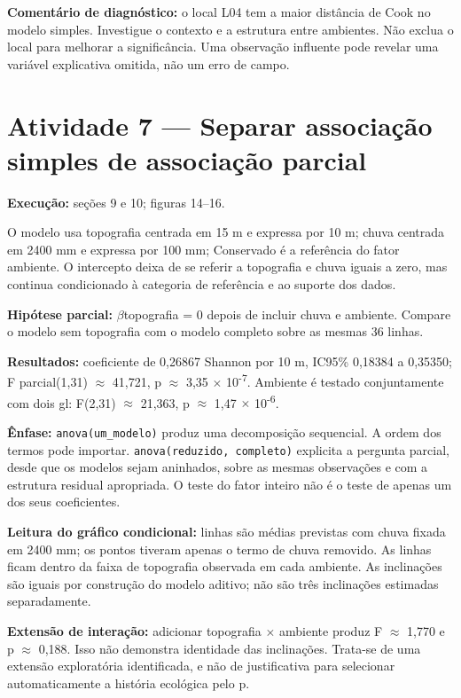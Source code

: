 \textbf{Comentário de diagnóstico:} o local L04 tem a maior distância de Cook no modelo simples. Investigue o contexto e a estrutura entre ambientes. Não exclua o local para melhorar a significância. Uma observação influente pode revelar uma variável explicativa omitida, não um erro de campo.

\section{Atividade 7 --- Separar associação simples de associação parcial}

\textbf{Execução:} seções 9 e 10; figuras 14--16.

O modelo usa topografia centrada em 15 m e expressa por 10 m; chuva centrada em 2400 mm e expressa por 100 mm; Conservado é a referência do fator ambiente. O intercepto deixa de se referir a topografia e chuva iguais a zero, mas continua condicionado à categoria de referência e ao suporte dos dados.

\textbf{Hipótese parcial:} \ensuremath{\beta}topografia = 0 depois de incluir chuva e ambiente. Compare o modelo sem topografia com o modelo completo sobre as mesmas 36 linhas.

\textbf{Resultados:} coeficiente de 0,26867 Shannon por 10 m, IC95\% 0,18384 a 0,35350; F parcial(1,31) \ensuremath{\approx} 41,721, p \ensuremath{\approx} 3,35 \ensuremath{\times} 10\textsuperscript{-}\textsuperscript{7}. Ambiente é testado conjuntamente com dois gl: F(2,31) \ensuremath{\approx} 21,363, p \ensuremath{\approx} 1,47 \ensuremath{\times} 10\textsuperscript{-}\textsuperscript{6}.

\textbf{Ênfase:} \texttt{anova(um\_modelo)} produz uma decomposição sequencial. A ordem dos termos pode importar. \texttt{anova(reduzido, completo)} explicita a pergunta parcial, desde que os modelos sejam aninhados, sobre as mesmas observações e com a estrutura residual apropriada. O teste do fator inteiro não é o teste de apenas um dos seus coeficientes.

\textbf{Leitura do gráfico condicional:} linhas são médias previstas com chuva fixada em 2400 mm; os pontos tiveram apenas o termo de chuva removido. As linhas ficam dentro da faixa de topografia observada em cada ambiente. As inclinações são iguais por construção do modelo aditivo; não são três inclinações estimadas separadamente.

\textbf{Extensão de interação:} adicionar topografia \ensuremath{\times} ambiente produz F \ensuremath{\approx} 1,770 e p \ensuremath{\approx} 0,188. Isso não demonstra identidade das inclinações. Trata-se de uma extensão exploratória identificada, e não de justificativa para selecionar automaticamente a história ecológica pelo p.

